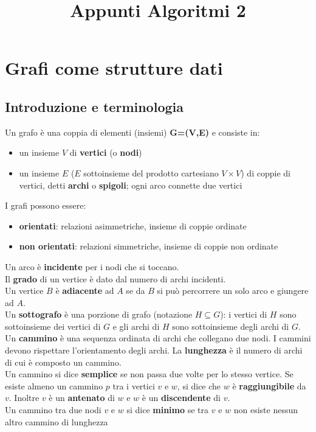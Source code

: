 \documentclass[11pt]{article}
\title{Appunti Algoritmi 2}
\begin{document}
\tableofcontents
\listofalgorithms
\newpage
{}
\section{Grafi come strutture dati}
\subsection{Introduzione e terminologia}
Un grafo è una coppia di elementi (insiemi) \textbf{G=(V,E)} e consiste in:
\begin{itemize}
    \item un insieme $V$ di \textbf{vertici} (o \textbf{nodi})
    \item un insieme $E$ ($E$ sottoinsieme del prodotto cartesiano $V\times V$) di coppie di vertici, detti \textbf{archi}
    o \textbf{spigoli}; ogni arco connette due vertici
\end{itemize}
I grafi possono essere:
\begin{itemize}
    \item \textbf{orientati}: relazioni asimmetriche, insieme di coppie ordinate
    \item \textbf{non orientati}: relazioni simmetriche, insieme di coppie non ordinate
\end{itemize}
Un arco è \textbf{incidente} per i nodi che si toccano.\\
Il \textbf{grado} di un vertice è dato dal numero di archi incidenti.\\
Un vertice $B$ è \textbf{adiacente} ad $A$ se da $B$ si può percorrere un solo arco e giungere ad $A$.\\
Un \textbf{sottografo} è una porzione di grafo (notazione $H\subseteq G$): i vertici di $H$ sono sottoinsieme dei vertici di $G$ 
e gli archi di $H$ sono sottoinsieme degli archi di $G$.\\
Un \textbf{cammino} è una sequenza ordinata di archi che collegano due nodi. I cammini devono rispettare l'orientamento 
degli archi. La \textbf{lunghezza} è il numero di archi di cui è composto un cammino.\\ Un cammino si dice \textbf{semplice} 
se non passa due volte per lo stesso vertice. Se esiste almeno un cammino $p$ tra i vertici $v$ e $w$, si dice che $w$ è 
\textbf{raggiungibile} da $v$. Inoltre $v$ è un \textbf{antenato} di $w$ e $w$ è un \textbf{discendente} di $v$.\\ 
Un cammino tra due nodi $v$ e $w$ si dice \textbf{minimo} se tra $v$ e $w$ non esiste nessun altro cammino di lunghezza 
\end{document}
